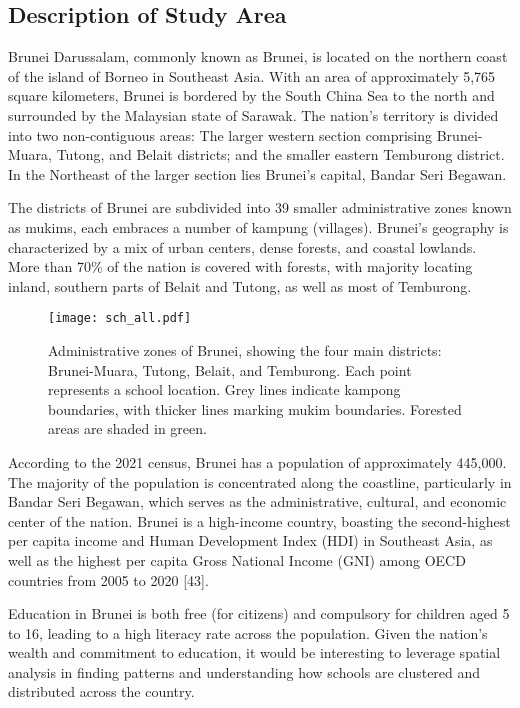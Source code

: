 \documentclass[12pt]{article}
\begin{document}
\subsection{Description of Study Area}
\label{subsec: study area}
Brunei Darussalam, commonly known as Brunei, is located on the northern coast of the island of Borneo in Southeast Asia. With an area of approximately 5,765 square kilometers, Brunei is bordered by the South China Sea to the north and surrounded by the Malaysian state of Sarawak. The nation’s territory is divided into two non-contiguous areas:  The larger western section comprising Brunei-Muara, Tutong, and Belait districts; and the smaller eastern Temburong district. In the Northeast of the larger section lies Brunei's capital, Bandar Seri Begawan. 

The districts of Brunei are subdivided into 39 smaller administrative zones known as mukims, each embraces a number of kampung (villages). Brunei’s geography is characterized by a mix of urban centers, dense forests, and coastal lowlands. More than 70\% of the nation is covered with forests, with majority locating inland, southern parts of Belait and Tutong, as well as most of Temburong.

\begin{figure}[htbp]
\centering
\texttt{[image: sch\_all.pdf]}
\caption{\label{fig:schools} Administrative zones of Brunei, showing the four main districts: Brunei-Muara, Tutong, Belait, and Temburong. Each point represents a school location. Grey lines indicate  kampong boundaries, with thicker lines marking mukim boundaries. Forested areas are shaded in green.}
\end{figure} 

According to the 2021 census, Brunei has a population of approximately 445,000. The majority of the population is concentrated along the coastline, particularly in Bandar Seri Begawan, which serves as the administrative, cultural, and economic center of the nation. Brunei is a high-income country, boasting the second-highest per capita income and Human Development Index (HDI) in Southeast Asia, as well as the highest per capita Gross National Income (GNI) among OECD countries from 2005 to 2020 [43].

Education in Brunei is both free (for citizens) and compulsory for children aged 5 to 16, leading to a high literacy rate across the population. Given the nation’s wealth and commitment to education, it would be interesting to leverage spatial analysis in finding patterns and understanding how schools are clustered and distributed across the country.
\end{document}
